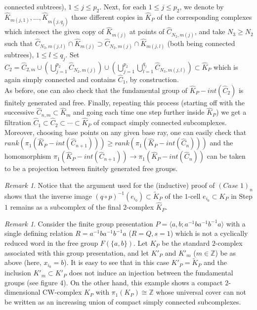 \documentclass{amsart}[12pt]
\theoremstyle{definition}
\theoremstyle{remark}
\newtheorem{remark}[theorem]{Remark}
\numberwithin{equation}{section}
\begin{document}
connected subtrees), $1 \leq j \leq p_2$. Next, for each $1 \leq j
\leq p_2$, we denote by $\widehat{K}_{m(j,1)}, \dots,
\widehat{K}_{m(j, q_j)}$ those different copies in $\widehat{K}_P$
of the corres\-pon\-ding complexes which intersect the given copy
of $\widehat{K}_{m(j)}$ at points of $\widehat{C}_{N_2, m(j)}$,
and take $N_3 \geq N_2$ such that $\widehat{C}_{N_3, m(j,l)} \cap
\widehat{K}_{m(j)} \supset \widehat{C}_{N_2, m(j)} \cap
\widehat{K}_{m(j,l)}$ (both being connected subtrees), $1 \leq l
\leq q_j$. Set $\widehat{C}_2 = \widehat{C}_{2,m} \cup
\displaystyle \left( \bigcup_{j=1}^{p_2} \widehat{C}_{N_2, m(j)}
\right) \cup \left( \bigcup_{j=1}^{p_2} \bigcup_{l=1}^{q_j}
\widehat{C}_{N_3, m(j,l)} \right) {\subset} \widehat{K}_P$ which is
again simply connected and contains $\widehat{C}_1$, by
construction.\\
\indent As before, one can also check that the fundamental group
of $\widehat{K}_P - int(\widehat{C}_2)$ is finitely generated and
free. Finally, repeating this process (starting off with the
successive $\widehat{C}_{n,m} {\subset} \widehat{K}_m$ and going each
time one step further inside $\widehat{K}_P$) we get a filtration
$\widehat{C}_1 {\subset} \widehat{C}_2 {\subset} \cdots {\subset} \widehat{K}_P$
of compact simply connected subcomplexes. Moreover, choosing base
points on any given base ray, one can easily check that
$rank(\pi_1(\widehat{K}_P - int(\widehat{C}_{n+1}))) \geq
rank(\pi_1(\widehat{K}_P - int(\widehat{C}_n)))$ and the
homomorphism $\pi_1(\widehat{K}_P - int(\widehat{C}_{n+1})) {\longrightarrow}
\pi_1(\widehat{K}_P - int(\widehat{C}_n))$ can be taken to be a
projection between finitely generated free groups.

\begin{remark} \label{lines}
Notice that the argument used for the (inductive) proof of $(Case
\; 1)_n$ shows that the inverse image $(q \circ p)^{-1}(e_{i_0})
{\subset} \widetilde{K}_P$ of the $1$-cell $e_{i_0} {\subset} K_P$ in Step
$1$ remains as a subcomplex of the final $2$-complex
$\widehat{K}_P$.
\end{remark}
\begin{remark} \label{example} Consider the finite group presentation
$P= \langle a,b ; a^{-1}ba^{-1}b^{-1}a \rangle$ with a single
defining relation $R=a^{-1}ba^{-1}b^{-1}a$ ($R=Q, s=1$) which is
not a cyclically reduced word in the free group $F(\{a,b\})$. Let
$K_P$ be the standard $2$-complex associated with this group
presentation, and let $K'_P$ and $K'_m$ ($m \in {\mathbb Z}$) be as above
(here, $x_{i_0}=b$). It is easy to see that in this case $K'_P =
\widetilde{K}_P$ and the inclusion $K'_m {\subset} K'_P$ does not
induce an injection between the fundamental groups (see figure 4).
On the other hand, this example shows a compact $2$-dimensional
CW-complex $K_P$ with $\pi_1(K_P) \cong {\mathbb Z}$ whose universal
cover can not be written as an increasing union of compact simply
connected subcomplexes.
\begin{figure}

\centerline{}
\label{figure4} \caption{}
\end{figure}
\end{remark}
\end{document}

